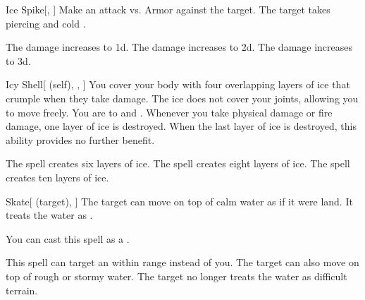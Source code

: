\lowercase{\hypertarget{spell:Ice Spike}{}}\label{spell:Ice Spike}
\begin{freeability}[Rank 2]{\hypertarget{spell:Ice Spike}{Ice Spike}}[, ]
Make an attack vs. Armor against the target.
\hit The target takes piercing and cold .

\rankline
{} The damage increases to  \plus1d.
 The damage increases to  \plus2d.
 The damage increases to  \plus3d.

\end{freeability}
\vspace{0.25em}



\lowercase{\hypertarget{spell:Icy Shell}{}}\label{spell:Icy Shell}
\begin{attuneability}[Rank 2]{\hypertarget{spell:Icy Shell}{Icy Shell}}[ (self), , ]
You cover your body with four overlapping layers of ice that crumple when they take damage.
The ice does not cover your joints, allowing you to move freely.
You are  to  and .
Whenever you take physical damage or fire damage, one layer of ice is destroyed.
When the last layer of ice is destroyed, this ability provides no further benefit.

\rankline
{} The spell creates six layers of ice.
 The spell creates eight layers of ice.
 The spell creates ten layers of ice.

\end{attuneability}
\vspace{0.25em}



\lowercase{\hypertarget{spell:Skate}{}}\label{spell:Skate}
\begin{attuneability}[Rank 2]{\hypertarget{spell:Skate}{Skate}}[ (target), ]
The target can move on top of calm water as if it were land.
It treats the water as .

You can cast this spell as a .

\rankline
{} This spell can target an  within \rngmed range instead of you.
 The target can also move on top of rough or stormy water.
 The target no longer treats the water as difficult terrain.

\end{attuneability}
\vspace{0.25em}



